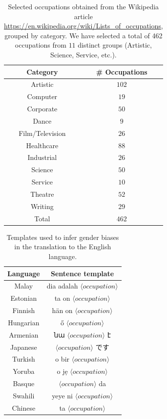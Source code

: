 \documentclass{article}
\begin{document}
\begin{table}[H]
	\centering
	\begin{tabular}{|c|c|}
	\hline
	Category 		& \# Occupations 	\\ \hline \hline
	Artistic 		& $102$ 			\\ \hline
	Computer 		& $19$ 				\\ \hline
	Corporate 		& $50$ 				\\ \hline
	Dance 			& $9$ 				\\ \hline
	Film/Television & $26$ 				\\ \hline
	Healthcare 		& $88$ 				\\ \hline
	Industrial 		& $26$ 				\\ \hline
	Science 		& $50$ 				\\ \hline
	Service 		& $10$ 				\\ \hline
	Theatre 		& $52$ 				\\ \hline
	Writing 		& $29$ 				\\ \hline
	\hline
	Total			& $462$				\\ \hline
	\end{tabular}
	\caption{Selected occupations obtained from the Wikipedia article \url{https://en.wikipedia.org/wiki/Lists_of_occupations}, grouped by category. We have selected a total of 462 occupations from $11$ distinct groups (Artistic, Science, Service, etc.).}
	\label{tab:occupations}
\end{table}

\begin{table}[H]
	\centering
	\begin{tabular}{|c|c|}
	\hline
	Language 	& Sentence template \\ \hline \hline
	Malay		& dia adalah $\langle occupation \rangle$ \\ \hline
	Estonian	& ta on $\langle occupation \rangle$ \\ \hline
	Finnish		& hän on $\langle occupation \rangle$ \\ \hline
	Hungarian	& ő $\langle occupation \rangle$ \\ \hline
	Armenian	& նա $\langle occupation \rangle$ է \\ \hline
	Japanese	& $\langle occupation \rangle$ です\\ \hline
	Turkish		& o bir $\langle occupation \rangle$ \\ \hline
	Yoruba		& o jẹ $\langle occupation \rangle$ \\ \hline
	Basque		& $\langle occupation \rangle$ da \\ \hline
	Swahili		& yeye ni $\langle occupation \rangle$ \\ \hline
	Chinese		& ta $\langle occupation \rangle$ \\ \hline
	\end{tabular}
	\caption{Templates used to infer gender biases in the translation to the English language.}
	\label{tab:templates}
\end{table}
\end{document}
